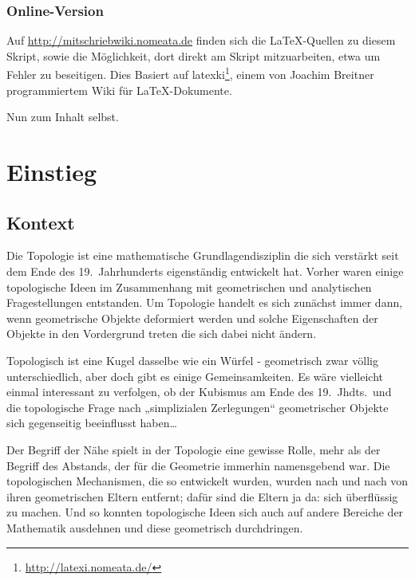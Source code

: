 \documentclass[12pt]{scrbook}   %
\begin{document}
\subsection*{Online-Version}
Auf \url{http://mitschriebwiki.nomeata.de} finden sich die \LaTeX-Quellen zu diesem Skript, sowie die Möglichkeit, dort direkt am Skript mitzuarbeiten, etwa um Fehler zu beseitigen. Dies Basiert auf latexki\footnote{\url{http://latexi.nomeata.de/}}, einem von Joachim Breitner programmiertem Wiki für \LaTeX-Dokumente.

\bigskip

Nun zum Inhalt selbst.

\setcounter{chapter}{0}
\renewcommand{\thechapter}{\Roman{chapter}}
\renewcommand{\theHchapter}{\Roman{chapter}}

\renewcommand{\thesection}{{\rm\bfseries §}\,\thechapter.\arabic{section}}
\renewcommand{\thealles}{\thechapter.\arabic{section}.\arabic{alles}}

\chapter{Einstieg}

\section{Kontext}

Die Topologie ist eine mathematische Grundlagendisziplin die sich verstärkt
seit dem Ende des 19.\ Jahrhunderts eigenständig entwickelt hat. Vorher waren
einige topologische Ideen im Zusammenhang mit geometrischen und analytischen 
Fragestellungen entstanden. Um Topologie handelt es sich zunächst immer dann,
wenn geometrische Objekte deformiert werden und solche Eigenschaften der 
Objekte in den Vordergrund treten die sich dabei nicht ändern. 

Topologisch ist eine Kugel dasselbe wie ein Würfel - geometrisch zwar 
völlig unterschiedlich, aber doch gibt es einige Gemeinsamkeiten. 
Es wäre vielleicht einmal interessant zu verfolgen, ob der Kubismus am Ende
des 19.\ Jhdts.\ und die topologische Frage nach „simplizialen 
Zerlegungen“ geometrischer Objekte sich gegenseitig beeinflusst haben\dots

Der Begriff der Nähe spielt in der Topologie eine gewisse Rolle, mehr als der
Begriff des Abstands, der für die Geometrie immerhin namensgebend war.
Die topologischen 
Mechanismen, die so entwickelt wurden, wurden nach und nach von ihren 
geometrischen Eltern entfernt; dafür sind die Eltern ja da: sich 
überflüssig zu machen. Und so konnten topologische Ideen sich auch auf 
andere Bereiche der Mathematik ausdehnen und diese geometrisch durchdringen.
\end{document}
